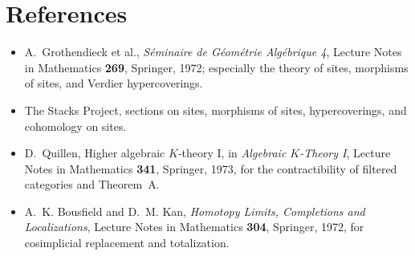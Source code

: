 \documentclass{article}
\theoremstyle{definition}
\theoremstyle{remark}
\begin{document}
\section*{References}

\begin{itemize}[leftmargin=2em]
\item A.~Grothendieck et al., \emph{S\'eminaire de G\'eom\'etrie Alg\'ebrique 4}, Lecture Notes in Mathematics \textbf{269}, Springer, 1972; especially the theory of sites, morphisms of sites, and Verdier hypercoverings.
\item The Stacks Project, sections on sites, morphisms of sites, hypercoverings, and cohomology on sites.
\item D.~Quillen, Higher algebraic \(K\)-theory I, in \emph{Algebraic \(K\)-Theory I}, Lecture Notes in Mathematics \textbf{341}, Springer, 1973, for the contractibility of filtered categories and Theorem~A.
\item A.~K. Bousfield and D.~M. Kan, \emph{Homotopy Limits, Completions and Localizations}, Lecture Notes in Mathematics \textbf{304}, Springer, 1972, for cosimplicial replacement and totalization.
\end{itemize}
\end{document}
